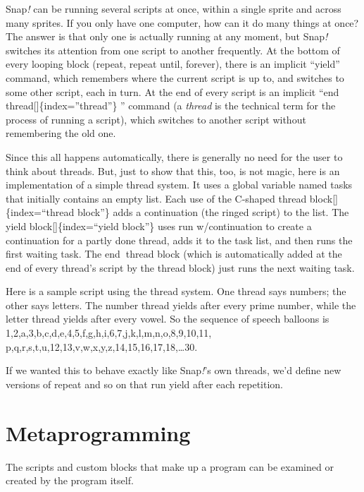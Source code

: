\documentclass[
  letterpaper,
]{book}
\begin{document}
Snap\emph{!} can be running several scripts at once, within a single
sprite and across many sprites. If you only have one computer, how can
it do many things at once? The answer is that only one is actually
running at any moment, but Snap\emph{!} switches its attention from one
script to another frequently. At the bottom of every looping block
(repeat, repeat until, forever), there is an implicit ``yield'' command,
which remembers where the current script is up to, and switches to some
other script, each in turn. At the end of every script is an implicit
``end thread{[}{]}\{index=''thread''\} '' command (a \emph{thread} is
the technical term for the process of running a script), which switches
to another script without remembering the old one.

Since this all happens automatically, there is generally no need for the
user to think about threads. But, just to show that this, too, is not
magic, here is an implementation of a simple thread system. It uses a
global variable named tasks that initially contains an empty list. Each
use of the C-shaped thread block{[}{]}\{index=``thread block''\} adds a
continuation (the ringed script) to the list. The yield
block{[}{]}\{index=``yield block''\} uses run w/continuation to create a
continuation for a partly done thread, adds it to the task list, and
then runs the first waiting task. The end\textbf{~}thread block (which
is automatically added at the end of every thread's script by the thread
block) just runs the next waiting task.

Here is a sample script using the thread system. One thread says
numbers; the other says letters. The number thread yields after every
prime number, while the letter thread yields after every vowel. So the
sequence of speech balloons is
1,2,a,3,b,c,d,e,4,5,f,g,h,i,6,7,j,k,l,m,n,o,8,9,10,11,
p,q,r,s,t,u,12,13,v,w,x,y,z,14,15,16,17,18,\ldots30.

If we wanted this to behave exactly like Snap\emph{!}'s own threads,
we'd define new versions of repeat and so on that run yield after each
repetition.


\chapter{Metaprogramming}\label{metaprogramming}

The scripts and custom blocks that make up a program can be examined or
created by the program itself.
\end{document}
